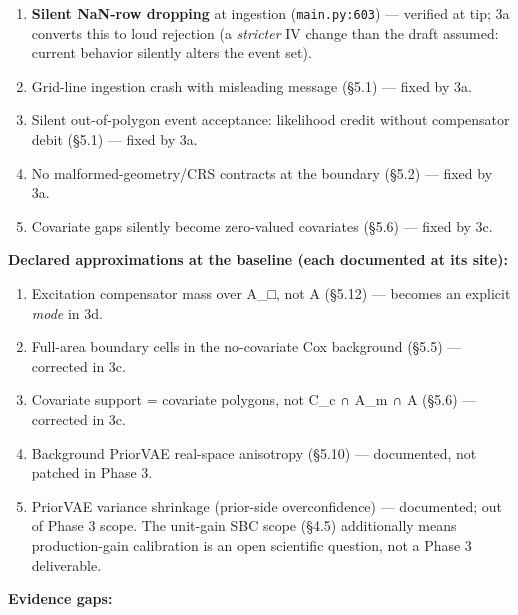 \documentclass[
  10pt,
]{article}
\providecommand{\tightlist}{%
  \setlength{\itemsep}{0pt}\setlength{\parskip}{0pt}}
\begin{document}
\begin{enumerate}
\def\labelenumi{\arabic{enumi}.}
\tightlist
\item
  \textbf{Silent NaN-row dropping} at ingestion (\texttt{main.py:603}) --- verified at tip; 3a converts this to loud rejection (a \emph{stricter} IV change than the draft assumed: current behavior silently alters the event set).
\item
  Grid-line ingestion crash with misleading message (§5.1) --- fixed by 3a.
\item
  Silent out-of-polygon event acceptance: likelihood credit without compensator debit (§5.1) --- fixed by 3a.
\item
  No malformed-geometry/CRS contracts at the boundary (§5.2) --- fixed by 3a.
\item
  Covariate gaps silently become zero-valued covariates (§5.6) --- fixed by 3c.
\end{enumerate}

\textbf{Declared approximations at the baseline (each documented at its site):}

\begin{enumerate}
\def\labelenumi{\arabic{enumi}.}
\setcounter{enumi}{5}
\tightlist
\item
  Excitation compensator mass over A\_□, not A (§5.12) --- becomes an explicit \emph{mode} in 3d.
\item
  Full-area boundary cells in the no-covariate Cox background (§5.5) --- corrected in 3c.
\item
  Covariate support = covariate polygons, not C\_c ∩ A\_m ∩ A (§5.6) --- corrected in 3c.
\item
  Background PriorVAE real-space anisotropy (§5.10) --- documented, not patched in Phase 3.
\item
  PriorVAE variance shrinkage (prior-side overconfidence) --- documented; out of Phase 3 scope. The unit-gain SBC scope (§4.5) additionally means production-gain calibration is an open scientific question, not a Phase 3 deliverable.
\end{enumerate}

\textbf{Evidence gaps:}
\end{document}
